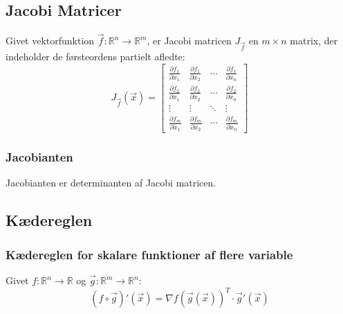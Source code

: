 









\subsection{Jacobi Matricer}
Givet vektorfunktion $\vec f: \mathbb{R}^n \to \mathbb{R}^m$, er Jacobi matricen $J_{\vec f}$ en $m \times n$ matrix, der indeholder de førsteordens partielt afledte:
\begingroup
\renewcommand*{\arraystretch}{1.5}
\[
    J_{\vec f}(\vec x) = \begin{bmatrix}
        \frac{\partial f_1}{\partial x_1} & \frac{\partial f_1}{\partial x_2} & \cdots & \frac{\partial f_1}{\partial x_n} \\
        \frac{\partial f_2}{\partial x_1} & \frac{\partial f_2}{\partial x_2} & \cdots & \frac{\partial f_2}{\partial x_n} \\
        \vdots & \vdots & \ddots & \vdots \\
        \frac{\partial f_m}{\partial x_1} & \frac{\partial f_m}{\partial x_2} & \cdots & \frac{\partial f_m}{\partial x_n}
    \end{bmatrix}
\]
\endgroup

\subsubsection{Jacobianten}
Jacobianten er determinanten af Jacobi matricen.

\subsection{Kædereglen}

\subsubsection{Kædereglen for skalare funktioner af flere variable}

Givet $f: \mathbb{R}^n \to \mathbb{R}$ og $\vec g: \mathbb{R}^m \to \mathbb{R}^n$:
\[
    (f \circ \vec g)'(\vec x) = \nabla f(\vec g(\vec x))^T \cdot \vec g'(\vec x)
\]

